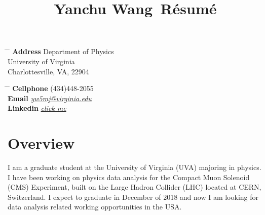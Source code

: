 \documentclass[10pt]{article} %
\begin{document}

\title{Yanchu Wang\, \small{Résumé}} %


\parbox{0.5\textwidth}{ %
\begin{tabbing} %
\hspace{3cm} \= \hspace{4cm} \= \kill %
{\bf Address} \> Department of Physics \\
\> University of Virginia\\ %
\> Charlottesville, VA, 22904 \\ %

\end{tabbing}}
\hfill %
\parbox{0.5\textwidth}{ %
\begin{tabbing} %
\hspace{3cm} \= \hspace{4cm} \= \kill %
{\bf Cellphone} \> (434)448-2055 \\ %
{\bf Email} \> \href{mailto:yw5mj@virginia.edu}{\textit{yw5mj@virginia.edu}} \\ %
{\bf Linkedin} \> \href{https://www.linkedin.com/in/yanchu-wang-46040289/}{\textit{click me}} \\ %
\end{tabbing}}


\section{Overview}

I am a graduate student at the University of Virginia (UVA) majoring in physics. I have been working on physics data analysis for the Compact Muon Solenoid (CMS) Experiment, built on the Large Hadron Collider (LHC) located at CERN, Switzerland. I expect to graduate in December of 2018 and now I am looking for data analysis related working opportunities in the USA.
\end{document}
